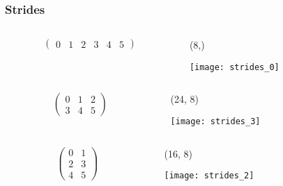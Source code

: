 \begin{frame}[fragile]\frametitle{Strides}
 \begin{columns}
  \begin{column}{0.33\linewidth}
   \begin{displaymath}
    \begin{pmatrix}
     0 & 1 & 2 & 3 & 4 & 5
    \end{pmatrix}
   \end{displaymath}
  \end{column}%
  \begin{column}{0.67\linewidth}
   (8,)

   \vspace{0.2truecm}
   \texttt{[image: strides\_0]}
  \end{column}
 \end{columns}

 \vspace{0.8truecm}
 \begin{columns}
  \begin{column}{0.33\linewidth}
   \begin{displaymath}
    \begin{pmatrix}
     0 & 1 & 2\\
     3 & 4 & 5
    \end{pmatrix}
   \end{displaymath}
  \end{column}%
  \begin{column}{0.67\linewidth}
   (24, 8)

   \vspace{0.2truecm}
   \texttt{[image: strides\_3]}
  \end{column}
 \end{columns}

 \vspace{0.8truecm}
 \begin{columns}
  \begin{column}{0.33\linewidth}
   \begin{displaymath}
    \begin{pmatrix}
     0 & 1 \\
     2 & 3 \\
     4 & 5
    \end{pmatrix}
   \end{displaymath}
  \end{column}%
  \begin{column}{0.67\linewidth}
   (16, 8)

   \vspace{0.2truecm}
   \texttt{[image: strides\_2]}
  \end{column}
 \end{columns}
\end{frame}

